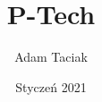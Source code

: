 \documentclass{beamer}
\title{P-Tech}
\author{Adam Taciak}
\institute{Fujitsu}
\date{Styczeń 2021}
\begin{document}
\frame{\titlepage}





%
%
\end{document}
